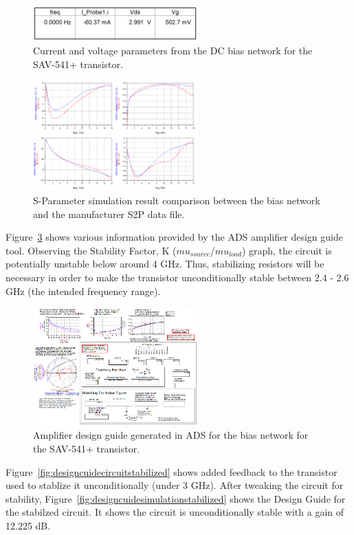 \documentclass[conference]{IEEEtran}
\begin{document}
\begin{figure}[!h]
\centering
\includegraphics[width=2.5in]{pics/DCBiasResults.png}
\caption{Current and voltage  parameters from the DC bias network for the SAV-541+ transistor.}
\label{fig:dcvalues}
\end{figure}

\begin{figure}[!h]
\centering
\includegraphics[width=2.5in]{pics/SParameterComparison.png}
\caption{S-Parameter simulation result comparison between the bias network and the manufacturer S2P data file.}
\label{fig:sparamresult}
\end{figure}

Figure~\ref{fig:designguide} shows various information provided by the ADS amplifier design guide tool.  Observing the Stability Factor, K ($mu_{source}$/$mu_{load}$) graph, the circuit is potentially unstable below around 4 GHz.  Thus, stabilizing resistors will be necessary in order to make the transistor unconditionally stable between 2.4 - 2.6 GHz (the intended frequency range).

\begin{figure}[!h]
\centering
\includegraphics[width=2.5in]{pics/DesignGuideUnoptimized.png}
\caption{Amplifier design guide generated in ADS for the bias network for the SAV-541+ transistor.}
\label{fig:designguide}
\end{figure}

Figure~\ref{fig:designcuidecircuitstabilized} shows added feedback to the transistor used to stablize it unconditionally (under 3 GHz).  After tweaking the circuit for stability, Figure~\ref{fig:designcuidesimulationstabilized} shows the Design Guide for the stabilzed circuit. It shows the circuit is unconditionally stable with a gain of 12.225 dB.
\end{document}
